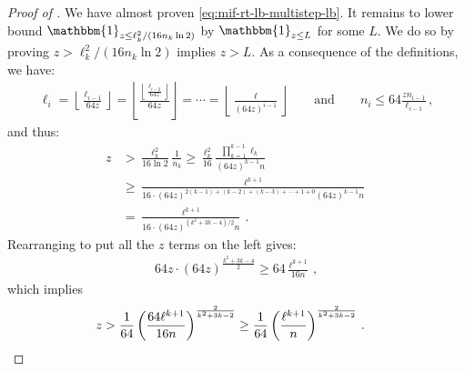 \documentclass[10pt,a4paper]{article}
\theoremstyle{definition}
\theoremstyle{remark}
\newcommand{\indic}{\mathbbm{1}}
\newcommand{\floor}[1]{{\left\lfloor{#1}\right\rfloor}}
\newcommand{\rl}{\mathbf{\ell}}             %
\begin{document}
\begin{itemize}
\begin{itemize}
\begin{proof}[Proof of ]
  We have almost proven \cref{eq:mif-rt-lb-multistep-lb}. It remains to lower bound
  $\indic_{z \le \rl_k^2 / (16 n_k \ln 2)}$ by $\indic_{z \le L}$ for some $L$. We do so by proving $z > \rl_k^2 / (16 n_k \ln 2)$ implies $z > L$. As a consequence of the definitions, we have:
  \begin{align*}
    \rl_i 
    =  \floor{\frac{\rl_{i-1}}{64 z} } 
    = \floor{\frac{\floor{\frac{\rl_{i-2}}{64 z}}}{64 z} } 
    = \cdots 
    =\floor{\frac{\rl}{(64 z)^{i-1}} } 
    \qquad \text{and} \qquad 
    n_i \le 64 \frac{z n_{i-1}}{\rl_{i-1}} \,,
  \end{align*}
  and thus:
  \begin{align*}
     z &> \frac{\rl_{k}^2}{16 \ln 2} \frac{1}{n_{k}} \ge \frac{\rl_{k}^2}{16} \frac{\prod_{k=1}^{k - 1} \rl_{k} }{(64 z)^{k - 1} n} \\
      & \ge \frac{\rl^{k + 1} }{16 \cdot (64 z)^{2 (k -1) + (k - 2) + (k - 3) + \cdots + 1 + 0}  (64 z)^{k - 1} n} \\
      & = \frac{\rl^{k + 1} }{16 \cdot (64 z)^{(k^2 + 3 k - 4) / 2} n} \,.
  \end{align*}
  Rearranging to put all the $z$ terms on the left gives:
  \begin{align*}
    64 z \cdot (64 z)^{\frac{k^2 + 3k - 4}{2}} \ge 64 \frac{\rl^{k+1}}{16 n} \,,
  \end{align*}
  which implies
  \begin{align*}
    z &> \frac{1}{64} \left(\frac{64 \rl^{k + 1}}{16 n}\right)^{\frac{2}{k^2 + 3 k - 2}} \ge \frac{1}{64} \left(\frac{\rl^{k + 1}}{n}\right)^{\frac{2}{k^2 + 3 k - 2}} \,. \qedhere
  \end{align*}
\end{proof}


\end{itemize}
\end{itemize}
\end{document}
